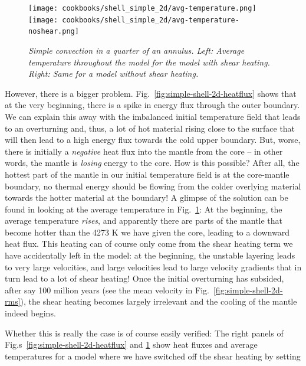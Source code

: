 \documentclass{article}
\begin{document}
\begin{figure}[tb]
  \texttt{[image: cookbooks/shell\_simple\_2d/avg-temperature.png]}
  \hfill
  \texttt{[image: cookbooks/shell\_simple\_2d/avg-temperature-noshear.png]}
  \caption{\it Simple convection in a quarter of an annulus. Left: Average
  temperature throughout the model for the
  model with shear heating. Right: Same for a model without shear heating.}
  \label{fig:simple-shell-2d-temperature}
\end{figure}

However, there is a bigger problem. Fig.~\ref{fig:simple-shell-2d-heatflux}
shows that at the very beginning, there is a spike in energy flux through the
outer boundary. We can explain this away with the imbalanced initial temperature
field that leads to an overturning and, thus, a lot of hot material rising close
to the surface that will then lead to a high energy flux towards the cold upper
boundary. But, worse, there is initially a \textit{negative} heat flux into the
mantle from the core -- in other words, the mantle is \textit{losing} energy to
the core. How is this possible? After all, the hottest part of the mantle in our
initial temperature field is at the core-mantle boundary, no thermal energy
should be flowing from the colder overlying material towards the hotter material
at the boundary! A glimpse of the solution can be found in looking at the
average temperature in Fig.~\ref{fig:simple-shell-2d-temperature}: At the
beginning, the average temperature \textit{rises}, and apparently there are
parts of the mantle that become hotter than the 4273 K we have given the core,
leading to a downward heat flux. This heating can of course only come from the
shear heating term we have accidentally left in the model: at the beginning, the
unstable layering leads to very large velocities, and large velocities lead to
large velocity gradients that in turn lead to a lot of shear heating! Once the
initial overturning has subsided, after say 100 million years (see the mean
velocity in Fig.~\ref{fig:simple-shell-2d-rms}), the shear heating becomes
largely irrelevant and the cooling of the mantle indeed begins.

Whether this is really the case is of course easily verified: The right panels
of Fig.s~\ref{fig:simple-shell-2d-heatflux}
and \ref{fig:simple-shell-2d-temperature} show heat fluxes and average
temperatures for a model where we have switched off the shear heating by setting


\end{document}
